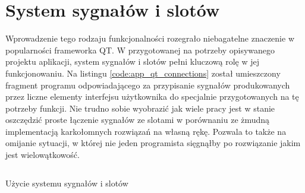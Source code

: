  \section{System sygnałów i slotów}
        Wprowadzenie tego rodzaju funkcjonalności rozegrało niebagatelne znaczenie w popularności frameworka QT. W przygotowanej na potrzeby opisywanego projektu aplikacji, system sygnałów i slotów pełni kluczową rolę w jej funkcjonowaniu. Na listingu \ref{code:app_qt_connections} został umieszczony fragment programu odpowiadającego za przypisanie sygnałów produkowanych przez liczne elementy interfejsu użytkownika do specjalnie przygotowanych na tę potrzeby funkcji. Nie trudno sobie wyobrazić jak wiele pracy jest w stanie oszczędzić proste łączenie sygnałów ze slotami w porównaniu ze żmudną implementacją karkołomnych rozwiązań na własną rękę. Pozwala to także na omijanie sytuacji, w której nie jeden programista sięgnąłby po rozwiązanie jakim jest wielowątkowość.
        
        \begin{kod}
          \inputminted[firstline=18, lastline=39]{cpp}{app/listings/mainwindow.cpp}
          \caption{Użycie systemu sygnałów i slotów}
          \label{code:app_qt_connections}
        \end{kod}
